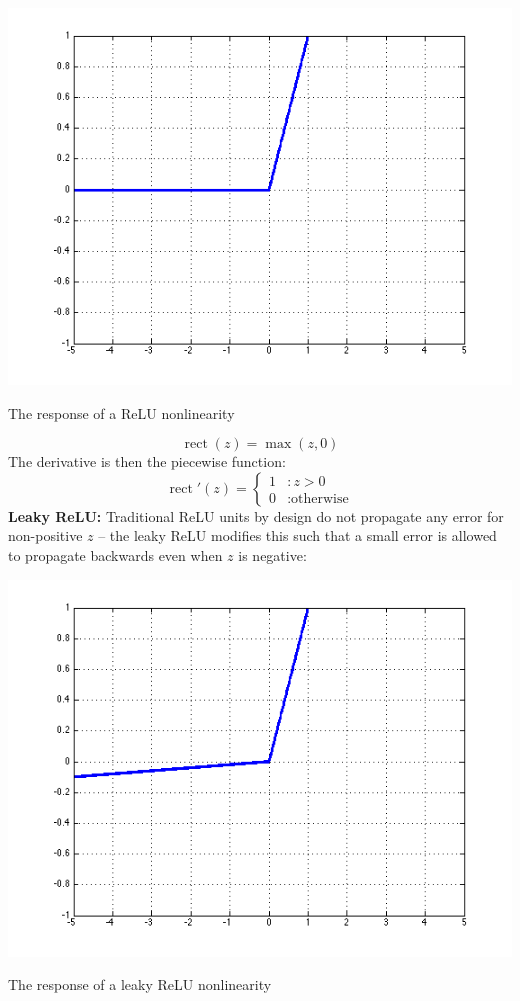 \documentclass{tufte-handout}
\begin{document}
\begin{marginfigure}%
  \includegraphics[width=\linewidth]{graph_relu}
  \caption{The response of a ReLU nonlinearity}
  \label{fig:graph_relu}
\end{marginfigure}
$$\operatorname{rect}(z) = \operatorname{max}(z, 0)$$
The derivative is then the piecewise function:
\begin{displaymath}
    \operatorname{rect}'(z) = \left\{
     \begin{array}{cl}
       1 & : z > 0\\
       0 & : \text{otherwise}
     \end{array}
   \right.
\end{displaymath} 
\textbf{Leaky ReLU:} Traditional ReLU units by design do not propagate any error for non-positive $z$ -- the leaky ReLU modifies this such that a small error is allowed to propagate backwards even when $z$ is negative:
\begin{marginfigure}%
  \includegraphics[width=\linewidth]{graph_leaky}
  \caption{The response of a leaky ReLU nonlinearity}
  \label{fig:graph_leaky}
\end{marginfigure}
\end{document}
